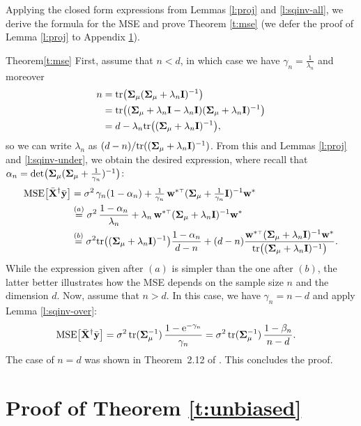 Applying the closed form expressions from Lemmas
\ref{l:proj} and \ref{l:sqinv-all}, we derive
the formula for the MSE and prove Theorem \ref{t:mse} (we defer the
proof of Lemma \ref{l:proj} to Appendix \ref{s:unbiased-proof}).
\begin{proofof}{Theorem}{\ref{t:mse}}
  First, assume that $n<d$, in which case we have
  $\gamma_n=\frac1{\lambda_n}$ and moreover
  \begin{align*}
    n &= \mathrm{tr}\big(\mathbf{\Sigma}_\mu(\mathbf{\Sigma}_\mu+\lambda_n\mathbf I)^{-1}\big)\\
      &=\mathrm{tr}\big((\mathbf{\Sigma}_\mu+\lambda_n\mathbf I-\lambda_n\mathbf I)(\mathbf{\Sigma}_\mu+\lambda_n\mathbf I)^{-1}\big)\\
    &=d - \lambda_n\mathrm{tr}\big((\mathbf{\Sigma}_\mu+\lambda_n\mathbf I)^{-1}\big),
  \end{align*}
so we can write $\lambda_n$ as $(d-n)/\mathrm{tr}((\mathbf{\Sigma}_\mu+\lambda_n\mathbf I)^{-1})$.
  From this and Lemmas \ref{l:proj} and \ref{l:sqinv-under}, we
obtain the desired expression, where recall
  that $\alpha_n = \det\!\big(\mathbf{\Sigma}_\mu (\mathbf{\Sigma}_\mu+\frac1{\gamma_n})^{-1}\big)$:
  \begin{align*}
    \MSE{\Xb^\dagger\ybb} &= \sigma^2\,\gamma_n(1-\alpha_n) +
    \tfrac1{\gamma_n} \,\w^{*\top}(\Sigmab_\mu+\tfrac1{\gamma_n}\I)^{-1}\w^*
    \\
    &\overset{(a)}{=}\sigma^2\,\frac{1-\alpha_n}{\lambda_n} +
    \lambda_n\,\w^{*\top}(\Sigmab_\mu+\lambda_n\I)^{-1}\w^*\\
    &\overset{(b)}{=}\sigma^2\tr\big((\Sigmab_\mu+\lambda_n\I)^{-1}\big)\frac{1-\alpha_n}{d-n}
      +
      (d-n)\frac{\w^{*\top}(\Sigmab_\mu+\lambda_n\I)^{-1}\w^*}
      {\tr\big((\Sigmab_\mu+\lambda_n\I)^{-1}\big)}.
  \end{align*}
  While the expression given after $(a)$ is simpler than the one
after $(b)$, the latter better illustrates how the MSE depends on
the sample size $n$ and the dimension $d$.
  Now, assume that $n>d$. In this case, we have $\gamma_n=n-d$ and apply Lemma
  \ref{l:sqinv-over}:
  \begin{align*}
    {\mathrm{MSE}\big[{\bar{\mathbf X}}^\dagger\bar{\mathbf y}\big]}
    &= \sigma^2\,\mathrm{tr}(\mathbf{\Sigma}_\mu^{-1})\,
\frac{1-\mathrm{e}^{-\gamma_n}}{\gamma_n}
=\sigma^2\,\mathrm{tr}(\mathbf{\Sigma}_\mu^{-1})
\,\frac{1-\beta_n}{n-d}.
  \end{align*}
The case of $n=d$ was shown in Theorem~2.12 of \cite{correcting-bias-journal}.
This concludes the proof.
\end{proofof}

\section{Proof of Theorem \ref{t:unbiased}}
\label{s:unbiased-proof}

